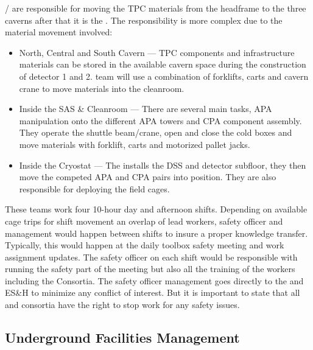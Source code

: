 \surf/ are responsible for moving the TPC materials from the
headframe to the three caverns after that it is the . The
 responsibility is more complex due to the material
movement involved:
\begin{itemize}
 \item North, Central and South Cavern --- TPC components and
   infrastructure materials can be stored in the available cavern
   space during the construction of detector 1 and 2.   team will
   use a combination of forklifts, carts and cavern crane to move
   materials into the cleanroom.
 \item Inside the SAS \& Cleanroom --- There are several main tasks, APA
   manipulation onto the different APA towers and CPA component
   assembly.  They operate the shuttle beam/crane, open and close the
   cold boxes and move materials with forklift, carts and motorized
   pallet jacks.
 \item Inside the Cryostat --- The  installs the DSS and detector
   subfloor, they then move the competed APA and CPA pairs into
   position.  They are also responsible for deploying the field cages.
\end{itemize}

These teams work four 10-hour day and afternoon shifts.  Depending on
available cage trips for shift movement an overlap of lead workers,
safety officer and management would happen between shifts to insure a
proper knowledge transfer.  Typically, this would happen at the daily
toolbox safety meeting and work assignment updates.  The safety
officer on each shift would be responsible with running the safety
part of the meeting but also all the training of the workers including
the Consortia. The safety officer management goes directly to the \surf
and  ES\&H to minimize any conflict of interest.  But it is
important to state that all  and consortia have the right to stop
work for any safety issues.

\subsection{Underground Facilities Management}

